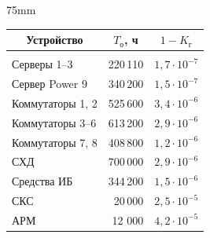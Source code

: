 \begin{floatingfigure}{75mm}  

\vspace*{-18pt}    


{\small %

      \begin{center}


      \vspace*{2ex}

      

     \tabcolsep=9.5pt

      \begin{tabular}{|l|r|c|}

      \hline

\multicolumn{1}{|c|}{Устройство}&

\multicolumn{1}{c|}{$T_{\mathrm{о}}$, ч}&$1-K_{\mathrm{г}}$\\

\hline

&&\\[-9pt]

Серверы 1--3&220\,110&$1{,}7\cdot 10^{-7}$\\

Сервер Power 9&340\,200&$1{,}5\cdot 10^{-7}$\\

Коммутаторы 1, 2&525\,600&$3{,}4\cdot 10^{-6}$\\

Коммутаторы 3--6&613\,200&$2{,}9\cdot 10^{-6}$\\

Коммутаторы 7, 8&408\,800&$1{,}2\cdot 10^{-6}$\\

СХД&700\,000&$2{,}9\cdot 10^{-6}$\\

Средства ИБ&344\,200&$1{,}5\cdot10^{-6}$\\

СКС&20\,000&$2{,}5\cdot10^{-5}$\\

АРМ&12 000 &$4{,}2\cdot 10^{-5}$\\

\hline

\end{tabular}

\end{center}}



\end{floatingfigure}


